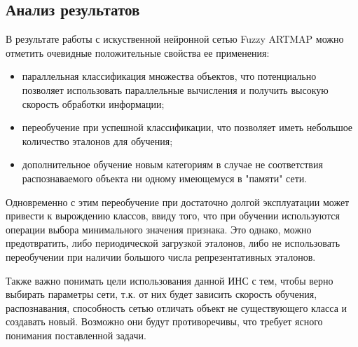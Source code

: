 \newpage
\subsection{Анализ результатов}

В результате работы с искуственной нейронной сетью Fuzzy ARTMAP можно отметить очевидные положительные свойства ее применения:
\begin{itemize} \compact
 	\item параллельная классификация множества объектов, что потенциально позволяет использовать параллельные вычисления и получить высокую скорость обработки информации;
 	\item переобучение при успешной классификации, что позволяет иметь небольшое количество эталонов для обучения;
 	\item дополнительное обучение новым категориям в случае не соответствия распознаваемого объекта ни одному имеющемуся в "памяти" сети.
\end{itemize} 

Одновременно с этим переобучение при достаточно долгой эксплуатации может привести к вырождению классов, ввиду того, что при обучении используются операции выбора минимального значения признака. Это однако, можно предотвратить, либо периодической загрузкой эталонов, либо не использовать переобучении при наличии большого числа репрезентативных эталонов.

Также важно понимать цели использования данной ИНС с тем, чтобы верно выбирать параметры сети, т.к. от них будет зависить скорость обучения, распознавания, способность сетью отличать объект не существующего класса и создавать новый. Возможно они будут противоречивы, что требует ясного понимания поставленной задачи. 

